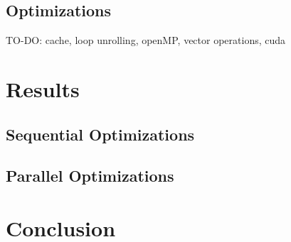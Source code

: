 \documentclass[12]{article}
\begin{document}
\subsection{Optimizations}

TO-DO: cache, loop unrolling, openMP, vector operations, cuda

\section{Results}

\subsection{Sequential Optimizations}

\subsection{Parallel Optimizations}

\section{Conclusion}
\end{document}
